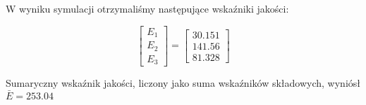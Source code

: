 W wyniku symulacji otrzymaliśmy następujące wskaźniki jakości:

\[
\begin{bmatrix}
    E_{\mathrm{1}} \\
    E_{\mathrm{2}} \\
    E_{\mathrm{3}} 
\end{bmatrix}
= 
\begin{bmatrix}
    \num{30.151} \\
    \num{141.56} \\
    \num{81.328}
\end{bmatrix}
\]

Sumaryczny wskaźnik jakości, liczony jako suma wskaźników składowych, 
wyniósł $\bar{E} = \num{253.04}$\\


